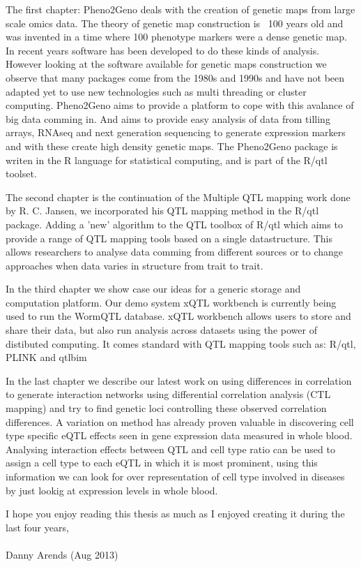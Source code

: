 The first chapter: Pheno2Geno deals with the creation of genetic maps from large scale omics data. 
The theory of genetic map construction is ~100 years old and was invented in a time where 100 
phenotype markers were a dense genetic map. In recent years software has been developed to do these 
kinds of analysis. However looking at the software available for genetic maps construction we 
observe that many packages come from the 1980s and 1990s and have not been adapted yet to use new 
technologies such as multi threading or cluster computing. Pheno2Geno aims to provide a platform to 
cope with this avalance of big data comming in. And aims to provide easy analysis of data from 
tilling arrays, RNAseq and next generation sequencing to generate expression markers and with these 
create high density genetic maps. The Pheno2Geno package is writen in the R language for statistical 
computing, and is part of the R/qtl toolset.

The second chapter is the continuation of the Multiple QTL mapping work done by R. C. Jansen, we 
incorporated his QTL mapping method in the R/qtl package. Adding a 'new' algorithm to the QTL 
toolbox of R/qtl which aims to provide a range of QTL mapping tools based on a single datastructure. 
This allows researchers to analyse data comming from different sources or to change approaches when 
data varies in structure from trait to trait.

In the third chapter we show case our ideas for a generic storage and computation platform. Our demo 
system xQTL workbench is currently being used to run the WormQTL database. xQTL workbench allows 
users to store and share their data, but also run analysis across datasets using the power of 
distibuted computing. It comes standard with  QTL mapping tools such as: R/qtl, PLINK and qtlbim

In the last chapter we describe our latest work on using differences in correlation to generate 
interaction networks using differential correlation analysis (CTL mapping) and try to find genetic 
loci controlling these observed correlation differences. A variation on method has already proven 
valuable in discovering cell type specific eQTL effects seen in gene expression data measured in 
whole blood. Analysing interaction effects between QTL and cell type ratio can be used to assign a 
cell type to each eQTL in which it is most prominent, using this information we can look for over 
representation of cell type involved in diseases by just lookig at expression levels in whole blood.

I hope you enjoy reading this thesis as much as I enjoyed creating it during the last four years,\\\\
Danny Arends (Aug 2013)
